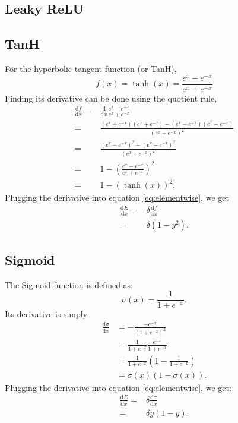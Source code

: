 \documentclass[a4paper]{article}
\begin{document}
\subsection{Leaky ReLU}
\subsection{TanH}
For the hyperbolic tangent function (or TanH), 
\begin{equation}
f(x)=\tanh(x)=\frac{e^{x}-e^{-x}}{e^{x}+e^{-x}}
\end{equation}
Finding its derivative can be done using the quotient rule,
\begin{align}
\frac{\mathrm{d}f}{\mathrm{d}x}
= & \frac{\mathrm{d}}{\mathrm{d}x}\frac{e^{x}-e^{-x}}{e^{x}+e^{-x}}\\
= & \frac{(e^{x}+e^{-x})(e^{x}+e^{-x})-(e^{x}-e^{-x})(e^{x}-e^{-x})}{(e^{x}+e^{-x})^2}\\
= & \frac{(e^{x}+e^{-x})^{2}-(e^{x}-e^{-x})^{2}}{(e^{x}+e^{-x})^2}\\
= & 1 - \left ( \frac{e^{x}-e^{-x}}{e^{x}+e^{-x}} \right )^{2}\\
= & 1 - \left( \tanh(x) \right)^{2}.
\end{align}
Plugging the derivative into equation \ref{eq:elementwise}, we get
\begin{align}
\frac{\mathrm{d} E }{\mathrm{d} x}= &\delta \frac{\mathrm{d} f }{\mathrm{d} x} \\
= & \delta \left ( 1-y^{2} \right ).
\end{align}

\subsection{Sigmoid}
The Sigmoid function is defined as:
\begin{equation}
\sigma (x)= \frac{1}{1+e^{-x}}.
\end{equation}
Its derivative is simply
\begin{align}
\frac{\mathrm{d} \sigma }{\mathrm{d} x}&= - \frac{-e^{-x}}{\left( 1+e^{-x} \right)^{2}} \\
&= \frac{1}{1+e^{-x}}\frac{e^{-x}}{1+e^{-x}} \\
&= \frac{1}{1+e^{-x}}\left(1-\frac{1}{1+e^{-x}}\right)\\
&= \sigma(x)\left(1-\sigma(x)\right).
\end{align}
Plugging the derivative into equation \ref{eq:elementwise}, we get:
\begin{align}
\frac{\mathrm{d} E }{\mathrm{d} x}= &\delta \frac{\mathrm{d} \sigma }{\mathrm{d} x} \\
= & \delta y\left ( 1-y \right ).
\end{align}
\end{document}
